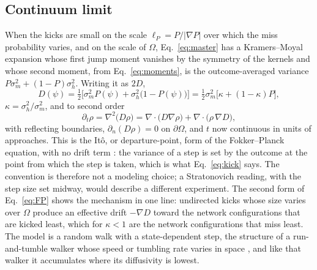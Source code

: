 \documentclass[pre,twocolumn,superscriptaddress,showpacs=false,amsmath,amssymb,nofootinbib]{revtex4-2}
\begin{document}
\subsection{Continuum limit}
When the kicks are small on the scale $\ell_P=P/|\nabla P|$ over which the miss probability varies, and on the scale of $\Omega$, Eq.~\eqref{eq:master} has a Kramers--Moyal expansion \cite{vanKampen1988} whose first jump moment vanishes by the symmetry of the kernels and whose second moment, from Eq.~\eqref{eq:moments}, is the outcome-averaged variance $P\sigma_m^2+(1-P)\sigma_h^2$. Writing it as $2D$,
\begin{equation}
D(\psi)=\tfrac12\bigl[\sigma_m^2P(\psi)+\sigma_h^2\bigl(1-P(\psi)\bigr)\bigr]
=\tfrac12\sigma_m^2\bigl[\kappa+(1-\kappa)P\bigr],
\label{eq:D}
\end{equation}
$\kappa=\sigma_h^2/\sigma_m^2$, and to second order
\begin{equation}
\partial_t\rho=\nabla^2\bigl(D\rho\bigr)=\nabla\cdot\bigl(D\nabla\rho\bigr)+\nabla\cdot\bigl(\rho\,\nabla D\bigr),
\label{eq:FP}
\end{equation}
with reflecting boundaries, $\partial_n(D\rho)=0$ on $\partial\Omega$, and $t$ now continuous in units of approaches. This is the It\^o, or departure-point, form of the Fokker--Planck equation, with no drift term \cite{Schnitzer1993,vanKampen1988,Volpe2016}: the variance of a step is set by the outcome at the point from which the step is taken, which is what Eq.~\eqref{eq:kick} says. The convention is therefore not a modeling choice; a Stratonovich reading, with the step size set midway, would describe a different experiment. The second form of Eq.~\eqref{eq:FP} shows the mechanism in one line: undirected kicks whose size varies over $\Omega$ produce an effective drift $-\nabla D$ toward the network configurations that are kicked least, which for $\kappa<1$ are the network configurations that miss least. The model is a random walk with a state-dependent step, the structure of a run-and-tumble walker whose speed or tumbling rate varies in space \cite{Schnitzer1993}, and like that walker it accumulates where its diffusivity is lowest.
\end{document}
